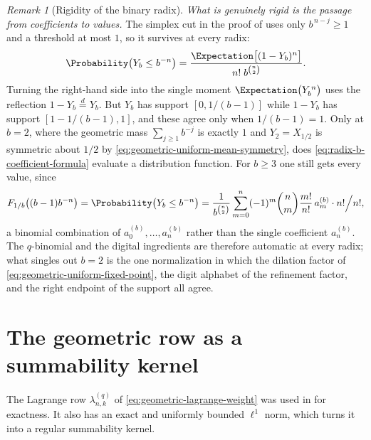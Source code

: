 \documentclass[11pt,a4paper,oneside,openany]{book}
\theoremstyle{definition}
\theoremstyle{remark}
\newtheorem{remark}[remark]{Remark}
\begin{document}
\begin{remark}[Rigidity of the binary radix]
\emph{What is genuinely rigid is the passage from coefficients to values.}  The simplex cut in the proof of  uses only $b^{\,n-j}\ge1$ and a threshold at most $1$, so it survives at every radix:
\[
 \Probability\bigl(Y_b\le b^{-n}\bigr)
 =\frac{\Expectation\bigl[(1-Y_b)^n\bigr]}{n!\;b^{\binom n2}} .
\]
Turning the right-hand side into the single moment $\Expectation\bigl(Y_b^{\,n}\bigr)$ uses the reflection $1-Y_b\overset d=Y_b$.  But $Y_b$ has support $[0,1/(b-1)]$ while $1-Y_b$ has support $[1-1/(b-1),1]$, and these agree only when $1/(b-1)=1$.  Only at $b=2$, where the geometric mass $\sum_{j\ge1}b^{-j}$ is exactly $1$ and $Y_2=X_{1/2}$ is symmetric about $1/2$ by \eqref{eq:geometric-uniform-mean-symmetry}, does \eqref{eq:radix-b-coefficient-formula} evaluate a distribution function.  For $b\ge3$ one still gets every value, since
\[
 F_{1/b}\bigl((b-1)b^{-n}\bigr)
 =\Probability\bigl(Y_b\le b^{-n}\bigr)
 =\frac1{b^{\binom n2}}\sum_{m=0}^{n}(-1)^m\binom nm\frac{m!}{n!}\,a^{(b)}_m\cdot n!\Big/n!,
\]
a binomial combination of $a^{(b)}_0,\ldots,a^{(b)}_n$ rather than the single coefficient $a^{(b)}_n$.  The $q$-binomial and the digital ingredients are therefore automatic at every radix; what singles out $b=2$ is the one normalization in which the dilation factor of \eqref{eq:geometric-uniform-fixed-point}, the digit alphabet of the refinement factor, and the right endpoint of the support all agree.
\end{remark}

\section{The geometric row as a summability kernel}

The Lagrange row $\lambda_{n,k}^{(q)}$ of \eqref{eq:geometric-lagrange-weight} was used
in  for exactness.  It also has an exact and uniformly
bounded $\ell^1$ norm, which turns it into a regular summability kernel.
\end{document}
